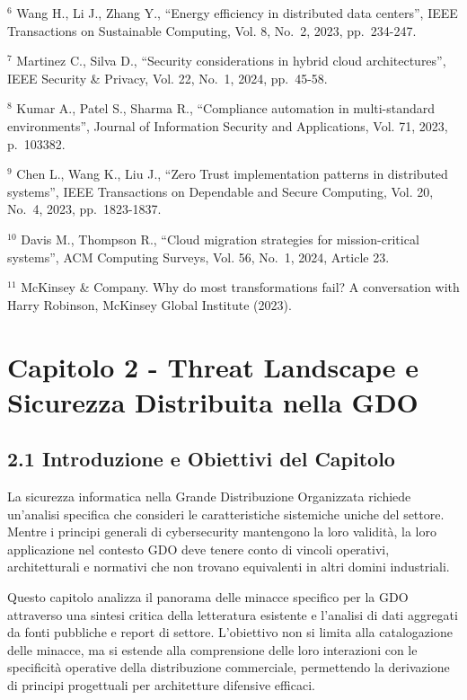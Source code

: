 \documentclass[12pt,a4paper,oneside]{book}
\numberwithin{figure}{chapter} %
\numberwithin{table}{chapter}  %
\begin{document}
$^6$ Wang H., Li J., Zhang Y., ``Energy efficiency in distributed data
centers'', IEEE Transactions on Sustainable Computing, Vol. 8, No.~2,
2023, pp.~234-247.

$^7$ Martinez C., Silva D., ``Security considerations in hybrid cloud
architectures'', IEEE Security \& Privacy, Vol. 22, No.~1, 2024,
pp.~45-58.

$^8$ Kumar A., Patel S., Sharma R., ``Compliance automation in
multi-standard environments'', Journal of Information Security and
Applications, Vol. 71, 2023, p.~103382.

$^9$ Chen L., Wang K., Liu J., ``Zero Trust implementation patterns in
distributed systems'', IEEE Transactions on Dependable and Secure
Computing, Vol. 20, No.~4, 2023, pp.~1823-1837.

$^{10}$ Davis M., Thompson R., ``Cloud migration strategies for
mission-critical systems'', ACM Computing Surveys, Vol. 56, No.~1, 2024,
Article 23.

$^{11}$ McKinsey \& Company. Why do most transformations fail? A conversation
with Harry Robinson, McKinsey Global Institute (2023).

\chapter{Capitolo 2 - Threat Landscape e Sicurezza Distribuita nella
GDO}\label{capitolo-2---threat-landscape-e-sicurezza-distribuita-nella-gdo}

\section{2.1 Introduzione e Obiettivi del
Capitolo}\label{introduzione-e-obiettivi-del-capitolo}

La sicurezza informatica nella Grande Distribuzione Organizzata richiede
un'analisi specifica che consideri le caratteristiche sistemiche uniche
del settore. Mentre i principi generali di cybersecurity mantengono la
loro validità, la loro applicazione nel contesto GDO deve tenere conto
di vincoli operativi, architetturali e normativi che non trovano
equivalenti in altri domini industriali.

Questo capitolo analizza il panorama delle minacce specifico per la GDO
attraverso una sintesi critica della letteratura esistente e l'analisi
di dati aggregati da fonti pubbliche e report di settore. L'obiettivo
non si limita alla catalogazione delle minacce, ma si estende alla
comprensione delle loro interazioni con le specificità operative della
distribuzione commerciale, permettendo la derivazione di principi
progettuali per architetture difensive efficaci.
\end{document}

